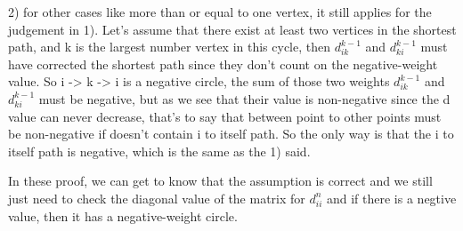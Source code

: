 \documentclass{article}
\begin{document}
2) for other cases like more than or equal to one vertex, it still applies for the judgement in 1). Let's assume that
there exist at least two vertices in the shortest path, and k is the largest number vertex in this cycle, then
$d_{ik}^{k-1}$ and $d_{ki}^{k-1}$ must have corrected the shortest path since they don't count on the negative-weight
value. So i -> k -> i is a negative circle, the sum of those two weights $d_{ik}^{k-1}$ and $d_{ki}^{k-1}$ must be negative, but as we see that their value is non-negative since the d value can never decrease, that's to say that
between point to other points must be non-negative if doesn't contain i to itself path. So the only way is that the i
to itself path is negative, which is the same as the 1) said.


In these proof, we can get to know that the assumption is correct and we still just need to check the diagonal value
of the matrix for $d_{ii}^{n}$ and if there is a negtive value, then it has a negative-weight circle.
\end{document}
